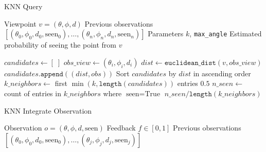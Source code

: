 \begin{singlespace}
    \begin{algorithm}[H]
        \caption{KNN Query}
        \label{alg:knn_query}
        \begin{algorithmic}
            \Require Viewpoint $v = (\theta, \phi, d)$
            \Require Previous observations $[(\theta_0, \phi_0, d_0, \text{seen}_0),\dots,(\theta_n, \phi_n, d_n, \text{seen}_n)]$
            \Require Parameters $k$, \texttt{max\_angle}
            \Ensure Estimated probability of seeing the point from $v$

            \State $candidates \gets [\;]$
            \State $obs\_view \gets (\theta_i, \phi_i, d_i)$
            \State $dist \gets \texttt{euclidean\_dist}(v, obs\_view)$
            \State $candidates.\texttt{append}((dist, obs))$
            \EndIf
            \EndFor
            \State Sort $candidates$ by $dist$ in ascending order
            \State $k\_neighbors \gets$ first $\min(k, \texttt{length}(candidates))$ entries
            \State \Return $0.5$
            \EndIf
            \State $n\_seen \gets$ count of entries in $k\_neighbors$ where $\text{seen} = \text{True}$
            \State \Return $n\_seen / \texttt{length}(k\_neighbors)$
        \end{algorithmic}
    \end{algorithm}
\end{singlespace}

\begin{singlespace}
    \begin{algorithm}[H]
        \caption{KNN Integrate Observation}
        \label{alg:knn_integrate}
        \begin{algorithmic}
            \Require Observation $o = (\theta, \phi, d, \text{seen})$
            \Require Feedback $f \in [0,1]$
            \Require Previous observations $[(\theta_0, \phi_0, d_0, \text{seen}_0),\dots,(\theta_j, \phi_j, d_j, \text{seen}_j)]$
            \Return
            \EndIf
            \State{\Return}
            \EndIf
            \Else
            \EndIf
            \Return
        \end{algorithmic}
    \end{algorithm}
\end{singlespace}

